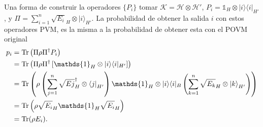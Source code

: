 Una forma de construir la operadores $\{P_i\}$ tomar  $\mathcal{K}=\mathcal{H}\otimes\mathcal{H'}$, $P _{i}=\mathds{1} _{H}\otimes |i\rangle \langle i|_{H'}$, y
$\Pi=\sum _{i=1}^{n}{\sqrt {E_{i}}}_{H}\otimes {|i\rangle }_{H'}$. La probabilidad de obtener la salida $i$ con estos operadores PVM, es la misma a la probabilidad de obtener esta con el POVM original {\cite{2007geometry}}
\begin{equation}
 \begin{split}
 p_i&=\tr \left(\Pi\rho\Pi^{\dagger }P _{i}\right)\\
 &=\tr \left(\Pi\rho \Pi^{\dagger }\left[\mathds{1}_{H}\otimes |i\rangle \langle i|_{H'}\right]\right)\\
 &=\tr \left(\rho\left(\sum _{j=1}^{n}{\sqrt {E{j}}}_{H}^{\dagger }\otimes {\langle j|}_{H'}\right)\mathds{1} _{H}\otimes |i\rangle \langle i|_{B}\left(\sum _{k=1}^{n}{\sqrt {E_{k}}}_{H}\otimes {|k\rangle }_{H'}\right)\right)\\
 &=\tr \left(\rho {\sqrt {E_{i}}}_{H}\mathds{1} _{H}{\sqrt {E_{i}}}_{H}\right)\\
 &=\tr (\rho E_{i}).
 \end{split}
\end{equation}
































